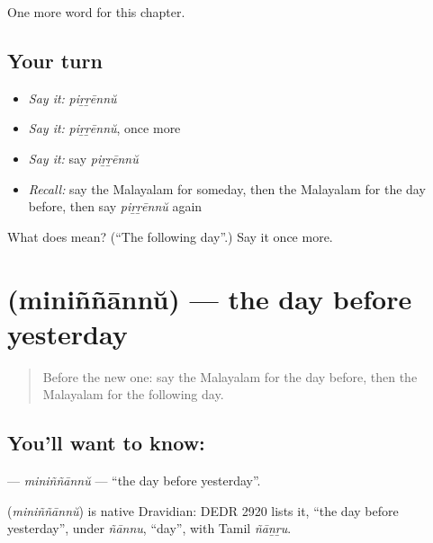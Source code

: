\begin{grammarlens}[title={What you've built}]
One more word for this chapter.
\end{grammarlens}

\subsection*{Your turn}
\begin{itemize}
\raggedright
  \item \emph{Say it:} \emph{piṟṟēnnŭ}
  \item \emph{Say it:} \emph{piṟṟēnnŭ}, once more
  \item \emph{Say it:} say \emph{piṟṟēnnŭ}
  \item \emph{Recall:} say the Malayalam for someday, then the Malayalam for the day before, then say \emph{piṟṟēnnŭ} again
\end{itemize}

\begin{tcolorbox}[breakable,colback=teal!4,colframe=teal!35!black,title={Before you move on}]
What does  mean? (\textquotedblleft{}The following day\textquotedblright{}.) Say it once more.
\end{tcolorbox}
\section[\texorpdfstring{\ml{മിനിഞ്ഞാന്ന്} (miniññānnŭ)}{മിനിഞ്ഞാന്ന് (miniññānnŭ)}]{ (miniññānnŭ) — the day before yesterday}

\label{lesson:ML-C237-mininnannu}



\begin{quote}
Before the new one: say the Malayalam for the day before, then the Malayalam for the following day.
\end{quote}

\subsection*{You'll want to know: }
\textbf{} — \emph{miniññānnŭ} — \textquotedblleft{}the day before yesterday\textquotedblright{}.

\begin{cousinweb}
\textbf{} (\emph{miniññānnŭ}) is native Dravidian: DEDR 2920 lists it, \textquotedblleft{}the day before yesterday\textquotedblright{}, under \emph{ñānnu}, \textquotedblleft{}day\textquotedblright{}, with Tamil \emph{ñāṉṟu}.
\end{cousinweb}

